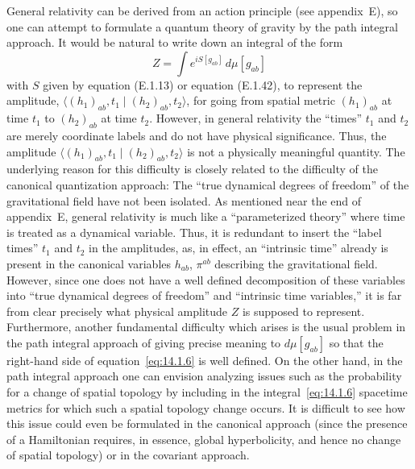 General relativity can be derived from an action principle (see appendix~E), so one
can attempt to formulate a quantum theory of gravity by the path integral approach.
It would be natural to write down an integral of the form
\begin{equation}
  Z=\int e^{iS[g_{ab}]}\,d\mu[g_{ab}]
  \tag{14.1.6}\label{eq:14.1.6}
\end{equation}
with \(S\) given by equation (E.1.13) or equation (E.1.42), to represent the amplitude,
\(\langle(h_1)_{ab},t_1\mid(h_2)_{ab},t_2\rangle\), for going from spatial metric
\((h_1)_{ab}\) at time \(t_1\) to \((h_2)_{ab}\) at time \(t_2\). However, in general
relativity the ``times'' \(t_1\) and \(t_2\) are merely coordinate labels and do not have
physical significance. Thus, the amplitude
\(\langle(h_1)_{ab},t_1\mid(h_2)_{ab},t_2\rangle\) is not a physically meaningful
quantity. The underlying reason for this difficulty is closely related to the difficulty
of the canonical quantization approach: The ``true dynamical degrees of freedom'' of
the gravitational field have not been isolated. As mentioned near the end of appendix~E,
general relativity is much like a ``parameterized theory'' where time is treated as a
dynamical variable. Thus, it is redundant to insert the ``label times'' \(t_1\) and \(t_2\)
in the amplitudes, as, in effect, an ``intrinsic time'' already is present in the canonical
variables \(h_{ab}\), \(\pi^{ab}\) describing the gravitational field. However, since one
does not have a well defined decomposition of these variables into ``true dynamical
degrees of freedom'' and ``intrinsic time variables,'' it is far from clear precisely what
physical amplitude \(Z\) is supposed to represent. Furthermore, another fundamental
difficulty which arises is the usual problem in the path integral approach of giving
precise meaning to \(d\mu[g_{ab}]\) so that the right-hand side of
equation~\eqref{eq:14.1.6} is well defined. On the other hand, in the path integral
approach one can envision analyzing issues such as the probability for a change of
spatial topology by including in the integral~\eqref{eq:14.1.6} spacetime metrics for
which such a spatial topology change occurs. It is difficult to see how this issue could
even be formulated in the canonical approach (since the presence of a Hamiltonian
requires, in essence, global hyperbolicity, and hence no change of spatial topology) or
in the covariant approach.

